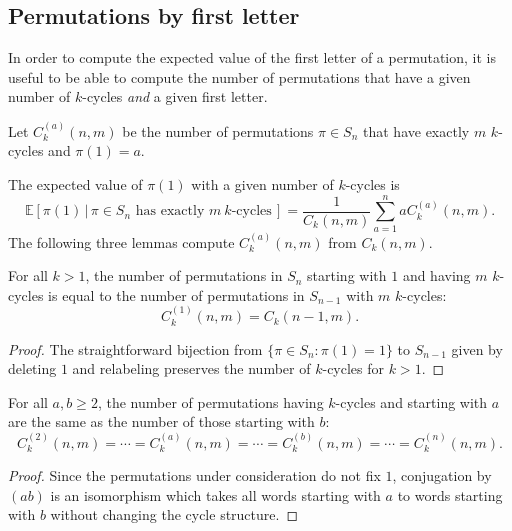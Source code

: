 \subsection{Permutations by first letter}
In order to compute the expected value of the first letter of a permutation,
it is useful to be able to compute the number of permutations that have a given
number of $k$-cycles \textit{and} a given first letter.
\begin{definition}
  Let $C_k^{(a)}(n,m)$ be the number of permutations $\pi \in S_n$ that
  have exactly $m$ $k$-cycles and $\pi(1) = a$.
\end{definition}
The expected value of $\pi(1)$ with a given number of
$k$-cycles
is
  \begin{equation}
    \mathbb{E}[\pi(1)\, |\, \pi \in S_n \text{ has exactly } m\ k \text{-cycles}\,] =
    \frac{1}{C_k(n, m)}\sum_{a=1}^n a C_k^{(a)}(n, m).
    \label{eq:weightedAverage}
  \end{equation}
The following three lemmas compute $C_k^{(a)}(n,m)$ from $C_k(n,m)$.
\begin{proposition}
  \label{cyc1Recurrence}
  For all $k > 1$, the number of permutations in $S_n$ starting with $1$ and
  having $m$ $k$-cycles is equal to the number of permutations in $S_{n-1}$ with
  $m$ $k$-cycles: \begin{equation}
    C_k^{(1)}(n,m) = C_k(n-1, m).
  \end{equation}
\end{proposition}
\begin{proof}
  The straightforward bijection from $\{\pi \in S_n : \pi(1) = 1\}$ to $S_{n-1}$
  given by deleting $1$ and relabeling preserves the number of $k$-cycles for
  $k > 1$.
\end{proof}
\begin{proposition}
  \label{allSame}
  For all $a, b \geq 2$, the number of permutations having $k$-cycles
  and starting with $a$ are the same as the number of those starting with $b$:
  \begin{equation}
    C_k^{(2)}(n,m) = \cdots = C_k^{(a)}(n,m) = \cdots = C_k^{(b)}(n,m) = \cdots = C_k^{(n)}(n,m).
  \end{equation}
\end{proposition}
\begin{proof}
  Since the permutations under consideration do not fix $1$,
  conjugation by $(ab)$ is an isomorphism which takes all words starting
  with $a$ to words starting with $b$ without changing the cycle structure.
\end{proof}
